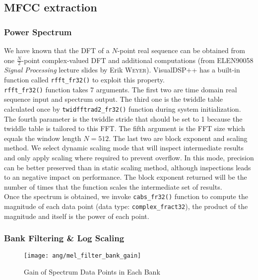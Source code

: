 \subsection{MFCC extraction}
\subsubsection{Power Spectrum}

We have known that the DFT of a $N$-point real sequence can be obtained from one $\frac{N}{2}$-point complex-valued DFT and additional computations (from ELEN90058 \textit{Signal Processing} lecture slides by Erik \textsc{Weyer}). VisualDSP++ has a built-in function called \texttt{rfft\_fr32()} to exploit this property.\\

\texttt{rfft\_fr32()} function takes 7 arguments. The first two are time domain real sequence input and spectrum output. The third one is the twiddle table calculated once by \texttt{twidfftrad2\_fr32()} function during system initialization. The fourth parameter is the twiddle stride that should be set to 1 because the twiddle table is tailored to this FFT. The fifth argument is the FFT size which equals the window length $N = 512$. The last two are block exponent and scaling method. We select dynamic scaling mode that will inspect intermediate results and only apply scaling where required to prevent overflow. In this mode, precision can be better preserved than in static scaling method, although inspections leads to an negative impact on performance. The block exponent returned will be the number of times that the function scales the intermediate set of results.\\

Once the spectrum is obtained, we invoke \texttt{cabs\_fr32()} function to compute the magnitude of each data point (data type: \texttt{complex\_fract32}), the product of the magnitude and itself is the power of each point.


\subsubsection{Bank Filtering \& Log Scaling}

\begin{figure}[H]
\centering
\texttt{[image: ang/mel\_filter\_bank\_gain]}
\caption{Gain of Spectrum Data Points in Each Bank}
\label{mel_filter_bank_gain}
\end{figure}

